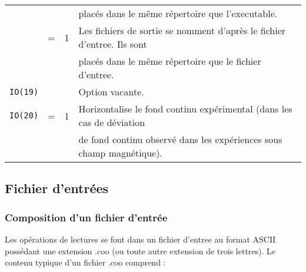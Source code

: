 \begin{table}
\begin{tabular}{|rcl|l|}
                  & &   & placés dans le même répertoire que l'executable.\\
                  &=& 1 & Les fichiers de sortie se nomment d'après le fichier d'entree. Ils sont \\
                  & &   & placés dans le même répertoire que le fichier d'entree.\\
\hline  
\lstinline{IO(19)}& &   & Option vacante.\\
\hline  
\lstinline{IO(20)}&=&1 & Horizontalise le fond continu expérimental (dans les cas de déviation \\
                  & &  & de fond continu observé dans les expériences sous champ magnétique).\\
\hline  
\end{tabular}
\end{table}


\FloatBarrier
\subsection{Fichier d'entrées}
\subsubsection{Composition d'un fichier d'entrée}
Les opérations de lectures se font dans un fichier d'entree au format ASCII possédant une extension .coo (ou toute autre extension de trois lettres).
Le contenu typique d'un fichier .coo comprend :

